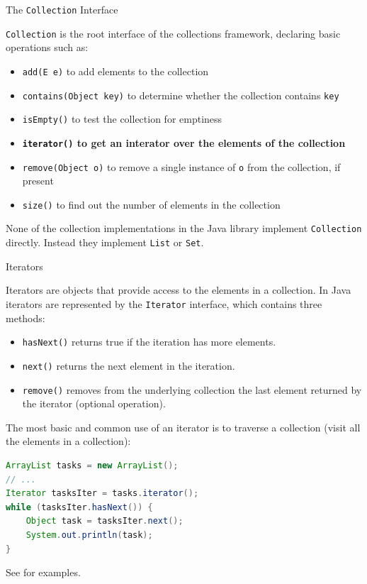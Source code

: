 \documentclass{beamer}
\begin{document}
\begin{frame}[fragile]{The {\tt Collection} Interface}


{\tt Collection} is the root interface of the collections framework, declaring basic operations such as:
\begin{itemize}
\item {\tt add(E e)} to add elements to the collection
\item {\tt contains(Object key)} to determine whether the collection contains {\tt key}
\item {\tt isEmpty()} to test the collection for emptiness
\item {\bf {\tt iterator()} to get an interator over the elements of the collection}
\item {\tt remove(Object o)} to remove a single instance of {\tt o} from the collection, if present
\item {\tt size()} to find out the number of elements in the collection
\end{itemize}
None of the collection implementations in the Java library implement {\tt Collection} directly.  Instead they implement {\tt List} or {\tt Set}.

\end{frame}


\begin{frame}[fragile]{Iterators}


Iterators are objects that provide access to the elements in a collection.  In Java iterators are represented by the {\tt Iterator} interface, which contains three methods:
\begin{itemize}
\item {\tt hasNext()} returns true if the iteration has more elements.
\item {\tt next()} returns the next element in the iteration.
\item {\tt remove()} removes from the underlying collection the last element returned by the iterator (optional operation).
\end{itemize}

The most basic and common use of an iterator is to traverse a collection (visit all the elements in a collection):
\begin{lstlisting}[language=Java]
ArrayList tasks = new ArrayList();
// ...
Iterator tasksIter = tasks.iterator();
while (tasksIter.hasNext()) {
    Object task = tasksIter.next();
    System.out.println(task);
}
\end{lstlisting}

See  for examples.

\end{frame}
\end{document}
